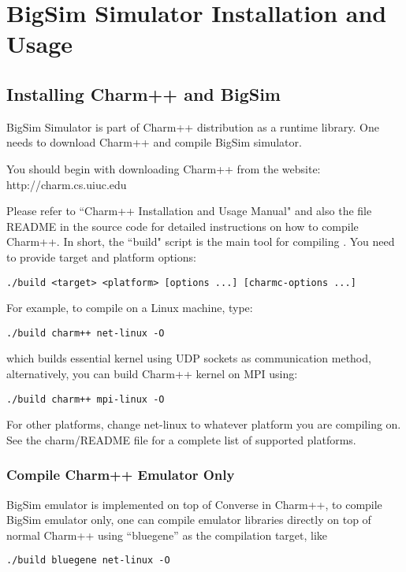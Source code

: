 \section{BigSim Simulator Installation and Usage}
\label{install}

\subsection{Installing Charm++ and BigSim}

BigSim Simulator is part of Charm++ distribution as a runtime 
library. One needs to download Charm++ and compile BigSim simulator.

You should begin with downloading Charm++ from the website:
http://charm.cs.uiuc.edu

Please refer to ``Charm++ Installation and Usage Manual" and also the file README
in the source code for detailed instructions on how to compile Charm++.
In short, the ``build" script is the main tool for compiling \charmpp{}.
You need to provide target and platform options:
\begin{verbatim}
./build <target> <platform> [options ...] [charmc-options ...]
\end{verbatim}

For example, to compile on a Linux machine, type:
\begin{verbatim}
./build charm++ net-linux -O
\end{verbatim}

which builds essential \charmpp{} kernel using UDP sockets as 
communication method, 
alternatively, you can build Charm++ kernel on MPI using:
\begin{verbatim}
./build charm++ mpi-linux -O
\end{verbatim}

For other platforms, change net-linux to whatever platform you are compiling 
on. See the charm/README file for a complete list of supported platforms.

\subsubsection{Compile Charm++ Emulator Only}

BigSim emulator is implemented on top of Converse in Charm++, 
to compile BigSim emulator only, one can compile emulator libraries
directly on top of normal Charm++ using ``bluegene'' as the compilation
target, like
\begin{verbatim}
./build bluegene net-linux -O
\end{verbatim}

